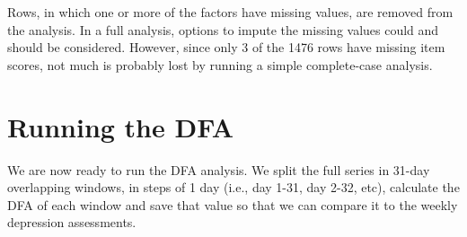\documentclass[]{book}
\newenvironment{Shaded}{\begin{snugshade}}{\end{snugshade}}
\newcommand{\KeywordTok}[1]{\textcolor[rgb]{0.13,0.29,0.53}{\textbf{#1}}}
\newcommand{\DecValTok}[1]{\textcolor[rgb]{0.00,0.00,0.81}{#1}}
\newcommand{\StringTok}[1]{\textcolor[rgb]{0.31,0.60,0.02}{#1}}
\newcommand{\CommentTok}[1]{\textcolor[rgb]{0.56,0.35,0.01}{\textit{#1}}}
\newcommand{\OperatorTok}[1]{\textcolor[rgb]{0.81,0.36,0.00}{\textbf{#1}}}
\newcommand{\NormalTok}[1]{#1}
\begin{document}
Rows, in which one or more of the factors have missing values, are
removed from the analysis. In a full analysis, options to impute the
missing values could and should be considered. However, since only 3 of
the 1476 rows have missing item scores, not much is probably lost by
running a simple complete-case analysis.

\begin{Shaded}
\end{Shaded}

\section{Running the DFA}\label{running-the-dfa}

We are now ready to run the DFA analysis. We split the full series in
31-day overlapping windows, in steps of 1 day (i.e., day 1-31, day 2-32,
etc), calculate the DFA of each window and save that value so that we
can compare it to the weekly depression assessments.
\end{document}
